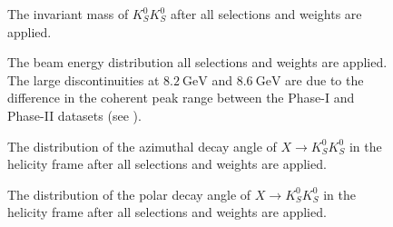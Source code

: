 \begin{figure}
  \begin{center}
    
  \end{center}
  \caption{The invariant mass of $K_S^0K_S^0$ after all selections and weights are applied.}\label{fig:meson-mass-data-pz-masscut-chisqdof-3.0-mesons-free-2}
\end{figure}
\begin{figure}
  \begin{center}
    
  \end{center}
  \caption{The beam energy distribution all selections and weights are applied. The large discontinuities at $\SI{8.2}{\giga\electronvolt}$ and $\SI{8.6}{\giga\electronvolt}$ are due to the difference in the coherent peak range between the Phase-I and Phase-II datasets (see ).}\label{fig:beam-energy-data-pz-masscut-chisqdof-3.0-mesons-free-2}
\end{figure}
\begin{figure}
  \begin{center}
    
  \end{center}
  \caption{The distribution of the azimuthal decay angle of $X \to K_S^0K_S^0$ in the helicity frame after all selections and weights are applied.}\label{fig:costheta-hx-v-meson-mass-data-pz-masscut-chisqdof-3.0-mesons-free-2}
\end{figure}
\begin{figure}
  \begin{center}
    
  \end{center}
  \caption{The distribution of the polar decay angle of $X \to K_S^0K_S^0$ in the helicity frame after all selections and weights are applied.}\label{fig:phi-hx-v-meson-mass-data-pz-masscut-chisqdof-3.0-mesons-free-2}
\end{figure}
